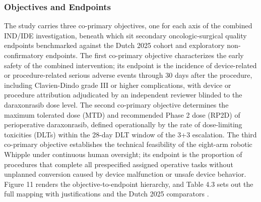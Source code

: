 \subsubsection{Objectives and Endpoints}

The study carries three co-primary objectives, one for each axis of the combined
IND/IDE investigation, beneath which sit secondary oncologic-surgical quality
endpoints benchmarked against the Dutch 2025 cohort and exploratory non-confirmatory
endpoints. The first co-primary objective characterizes the early safety of the
combined intervention; its endpoint is the incidence of device-related or
procedure-related serious adverse events through 30 days after the procedure,
including Clavien-Dindo grade III or higher complications, with device or procedure
attribution adjudicated by an independent reviewer blinded to the daraxonrasib dose
level. The second co-primary objective determines the maximum tolerated dose (MTD)
and recommended Phase 2 dose (RP2D) of perioperative daraxonrasib, defined
operationally by the rate of dose-limiting toxicities (DLTs) within the 28-day DLT
window of the 3+3 escalation. The third co-primary objective establishes the
technical feasibility of the eight-arm robotic Whipple under continuous human
oversight; its endpoint is the proportion of procedures that complete all
prespecified assigned operative tasks without unplanned conversion caused by device
malfunction or unsafe device behavior. Figure 11 renders the objective-to-endpoint
hierarchy, and Table 4.3 sets out the full mapping with justifications and the Dutch
2025 comparators \cite{daraxwhipple,phase1guidance}.

